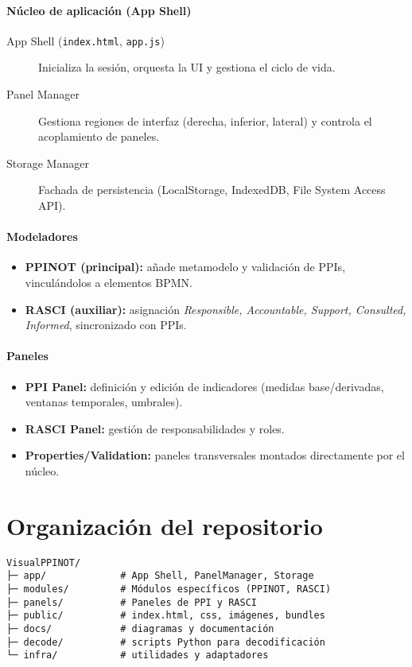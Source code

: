 \paragraph{Núcleo de aplicación (App Shell)}
\begin{description}
  \item[App Shell (\texttt{index.html}, \texttt{app.js})] Inicializa la sesión, orquesta la UI y gestiona el ciclo de vida.
  \item[Panel Manager] Gestiona regiones de interfaz (derecha, inferior, lateral) y controla el acoplamiento de paneles.
  \item[Storage Manager] Fachada de persistencia (LocalStorage, IndexedDB, File System Access API).
\end{description}

\paragraph{Modeladores}
\begin{itemize}
  \item \textbf{PPINOT (principal):} añade metamodelo y validación de PPIs, vinculándolos a elementos BPMN.
  \item \textbf{RASCI (auxiliar):} asignación \textit{Responsible, Accountable, Support, Consulted, Informed}, sincronizado con PPIs.
\end{itemize}

\paragraph{Paneles}
\begin{itemize}
  \item \textbf{PPI Panel:} definición y edición de indicadores (medidas base/derivadas, ventanas temporales, umbrales).
  \item \textbf{RASCI Panel:} gestión de responsabilidades y roles.
  \item \textbf{Properties/Validation:} paneles transversales montados directamente por el núcleo.
\end{itemize}

\section{Organización del repositorio}
\label{subsec:repo}
\begin{verbatim}
VisualPPINOT/
├─ app/             # App Shell, PanelManager, Storage
├─ modules/         # Módulos específicos (PPINOT, RASCI)
├─ panels/          # Paneles de PPI y RASCI
├─ public/          # index.html, css, imágenes, bundles
├─ docs/            # diagramas y documentación
├─ decode/          # scripts Python para decodificación
└─ infra/           # utilidades y adaptadores
\end{verbatim}

